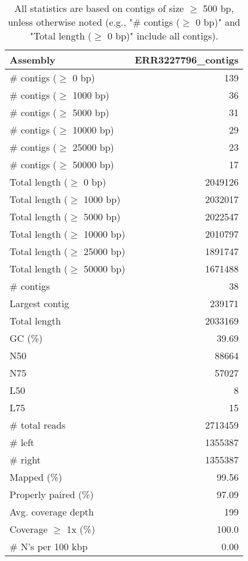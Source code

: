\documentclass[12pt,a4paper]{article}
\begin{document}
\begin{table}[ht]
\begin{center}
\caption{All statistics are based on contigs of size $\geq$ 500 bp, unless otherwise noted (e.g., "\# contigs ($\geq$ 0 bp)" and "Total length ($\geq$ 0 bp)" include all contigs).}
\begin{tabular}{|l*{1}{|r}|}
\hline
Assembly & ERR3227796\_contigs \\ \hline
\# contigs ($\geq$ 0 bp) & 139 \\ \hline
\# contigs ($\geq$ 1000 bp) & 36 \\ \hline
\# contigs ($\geq$ 5000 bp) & 31 \\ \hline
\# contigs ($\geq$ 10000 bp) & 29 \\ \hline
\# contigs ($\geq$ 25000 bp) & 23 \\ \hline
\# contigs ($\geq$ 50000 bp) & 17 \\ \hline
Total length ($\geq$ 0 bp) & 2049126 \\ \hline
Total length ($\geq$ 1000 bp) & 2032017 \\ \hline
Total length ($\geq$ 5000 bp) & 2022547 \\ \hline
Total length ($\geq$ 10000 bp) & 2010797 \\ \hline
Total length ($\geq$ 25000 bp) & 1891747 \\ \hline
Total length ($\geq$ 50000 bp) & 1671488 \\ \hline
\# contigs & 38 \\ \hline
Largest contig & 239171 \\ \hline
Total length & 2033169 \\ \hline
GC (\%) & 39.69 \\ \hline
N50 & 88664 \\ \hline
N75 & 57027 \\ \hline
L50 & 8 \\ \hline
L75 & 15 \\ \hline
\# total reads & 2713459 \\ \hline
\# left & 1355387 \\ \hline
\# right & 1355387 \\ \hline
Mapped (\%) & 99.56 \\ \hline
Properly paired (\%) & 97.09 \\ \hline
Avg. coverage depth & 199 \\ \hline
Coverage $\geq$ 1x (\%) & 100.0 \\ \hline
\# N's per 100 kbp & 0.00 \\ \hline
\end{tabular}
\end{center}
\end{table}
\end{document}
